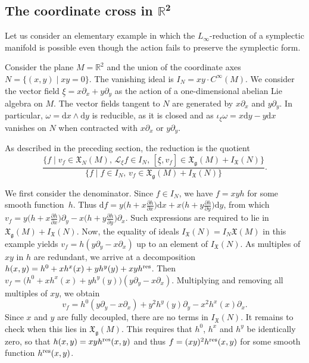 \documentclass[10pt,a4paper]{amsart}
\numberwithin{equation}{section}
\newcommand{\R}{\mathbb{R}}
\newcommand{\g}{\mathfrak{g}}
\newcommand{\fgmodule}{\mathfrak{X}_{\g}}
\newcommand{\tgtvf}{\mathfrak X_N(M)}
\newcommand{\vanvf}{I_{\mathfrak{X}}(N)}%
\renewcommand{\L}{\mathscr{L}}
\renewcommand{\d}{\mathrm{d}}
\begin{document}
\subsection[The coordinate cross in R\^{}2]{The coordinate cross in $\boldsymbol{\R^2}$}\label{Ssec:coordinate_cross}

Let us consider an elementary example in which the $L_\infty$-reduction of a symplectic manifold is possible even though the action fails to preserve the symplectic form.

Consider the plane $M=\mathbb R^2$ and the union of the coordinate axes $N=\{ (x,y) \mid  xy=0\}$. The vanishing ideal is $I_N=xy\cdot C^\infty(M)$. We consider the vector field $\underline\xi =x\partial_x+y\partial_y$ as the action of a one-dimensional abelian Lie algebra on $M$. The vector fields tangent to $N$ are generated by $x\partial_x$ and $y\partial_y$. In particular, $\omega=\d x\wedge \d y$ is reducible, as it is closed and as $\iota_\xi\omega= x \d y-y\d x$ vanishes on $N$ when contracted with $x\partial_x$ or $y\partial_y$.

As described in the preceding section, the reduction is the quotient
\[
	\frac{ \bigl\{ f\mid  v_f\in \tgtvf,\, \L_\xi f\in I_N,\, [\underline{\xi},v_f]\in \fgmodule(M) + \vanvf \bigr\}
	}{
	\{
	f\mid  f\in I_N,\, v_f\in \fgmodule(M) + \vanvf
	\}
	}.
\]

We first consider the denominator. Since $f\in I_N$, we have $f=xyh$ for some smooth function~$h$. Thus $\d f=y\bigl(h+x\frac{\partial h}{\partial x}\bigr)\d x +x\bigl(h+y\frac{\partial h}{\partial y}\bigr)\d y$, from which $v_f=y\bigl(h+x\frac{\partial h}{\partial x}\bigr)\partial_y - x{\bigl(h+y\frac{\partial h}{\partial y}\bigr)}\partial_x$. Such expressions are required to lie in $\fgmodule(M)+\vanvf$. Now, the equality of ideals $\vanvf=I_N \mathfrak X(M)$ in this example yields $v_f=h(y\partial_y-x\partial_x)$ up to an element of $\vanvf$. As multiples of $xy$ in $h$ are redundant, we arrive at a decomposition $h(x,y)=h^0 + xh^x(x)+yh^y(y)+xyh^{\rm res}$. Then $v_f= \bigl(h^0+xh^x(x)+yh^y(y)\bigr)(y\partial_y-x\partial_x)$. Multiplying and removing all multiples of $xy$, we obtain
\[
v_f=h^0(y\partial_y-x\partial_x) + y^2h^y(y)\partial_y - x^2h^x(x)\partial_x .
\]
Since $x$ and $y$ are fully decoupled, there are no terms in $\vanvf$. It remains to check when this lies in $\fgmodule(M)$. This requires that $h^0$, $h^x$ and $h^y$ be identically zero, so that $h(x,y)=xyh^{\rm res}(x,y)$ and thus $f=(xy)^2h^{\rm res}(x,y)$ for some smooth function $h^{\rm res}(x,y)$.
\end{document}

